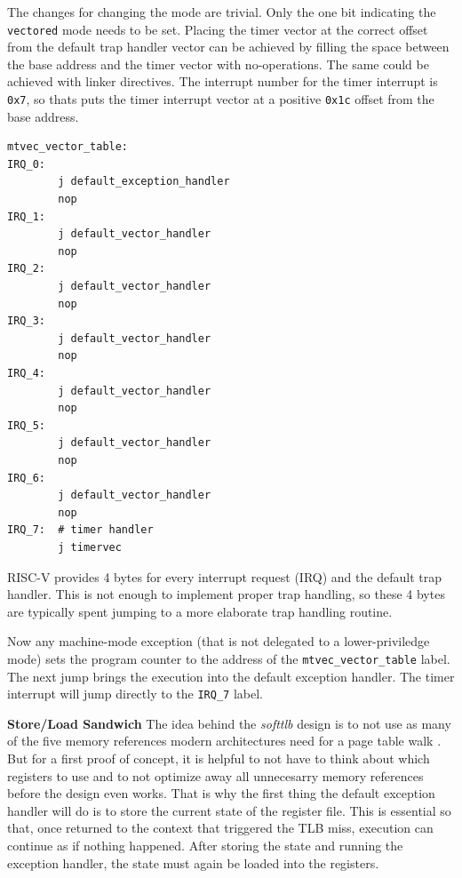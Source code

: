 The changes for changing the mode are trivial. Only the one bit indicating the \texttt{vectored} mode
needs to be set.
Placing the timer vector at the correct offset from the default trap handler vector can be achieved by
filling the space between the base address and the timer vector with no-operations. The same could be
achieved with linker directives.
The interrupt number for the timer interrupt is \texttt{0x7}, so thats puts the timer interrupt vector
at a positive \texttt{0x1c} offset from the base address.

\begin{lstlisting}[language={[RISC-V]Assembler},float=h!,
    label={lst:defaultTrapHandler}, caption={Vectored Trap Handler Routine}]
mtvec_vector_table:
IRQ_0:
        j default_exception_handler
        nop
IRQ_1:
        j default_vector_handler
        nop
IRQ_2:
        j default_vector_handler
        nop
IRQ_3:
        j default_vector_handler
        nop
IRQ_4:
        j default_vector_handler
        nop
IRQ_5:
        j default_vector_handler
        nop
IRQ_6:
        j default_vector_handler
        nop
IRQ_7:  # timer handler
        j timervec
\end{lstlisting}


RISC-V provides 4 bytes for every interrupt request (IRQ) and the default trap handler. This is not enough
to implement proper trap handling, so these 4 bytes are typically spent jumping to a more elaborate trap
handling routine.

Now any machine-mode exception (that is not delegated to a lower-priviledge mode) sets the program counter
to the address of the \texttt{mtvec\_vector\_table} label. The next jump brings the execution into
the default exception handler.
The timer interrupt will jump directly to the \texttt{IRQ\_7} label.

\textbf{Store/Load Sandwich} The idea behind the \textit{softtlb} design is to not use as many of the five
memory references modern architectures need for a page table walk \cite{intel5LevelPaging5Level2017}. But
for a first proof of concept, it is helpful to not have to think about which registers to use and to not optimize
away all unnecesarry memory references before the design even works.
That is why the first thing the default exception handler will do is to store the current state of the register
file.
This is essential so that, once returned to the context that triggered the TLB miss, execution can continue
as if nothing happened.
After storing the state and running the exception handler, the state must again be loaded into the registers.

